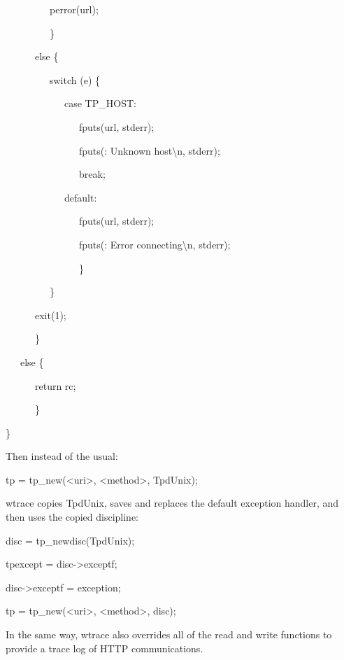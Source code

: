 {\ttfamily\mdseries
\ \ \ \ \ \ \ \ \ perror(url);}

{\ttfamily\mdseries
\ \ \ \ \ \ \ \ \ \}}

{\ttfamily\mdseries
\ \ \ \ \ \ else \{}

{\ttfamily\mdseries
\ \ \ \ \ \ \ \ \ switch (e) \{}

{\ttfamily\mdseries
\ \ \ \ \ \ \ \ \ \ \ \ case TP\_HOST:}

{\ttfamily\mdseries
\ \ \ \ \ \ \ \ \ \ \ \ \ \ \ fputs(url, stderr);}

{\ttfamily\mdseries
\ \ \ \ \ \ \ \ \ \ \ \ \ \ \ fputs({\textquotedbl}: Unknown host{\textbackslash}n{\textquotedbl}, stderr);}

{\ttfamily\mdseries
\ \ \ \ \ \ \ \ \ \ \ \ \ \ \ break;}

{\ttfamily\mdseries
\ \ \ \ \ \ \ \ \ \ \ \ default:}

{\ttfamily\mdseries
\ \ \ \ \ \ \ \ \ \ \ \ \ \ \ fputs(url, stderr);}

{\ttfamily\mdseries
\ \ \ \ \ \ \ \ \ \ \ \ \ \ \ fputs({\textquotedbl}: Error connecting{\textbackslash}n{\textquotedbl}, stderr);}

{\ttfamily\mdseries
\ \ \ \ \ \ \ \ \ \ \ \ \ \ \ \}}

{\ttfamily\mdseries
\ \ \ \ \ \ \ \ \ \}}

{\ttfamily\mdseries
\ \ \ \ \ \ exit(1); }

{\ttfamily\mdseries
\ \ \ \ \ \ \}}

{\ttfamily\mdseries
\ \ \ else \{}

{\ttfamily\mdseries
\ \ \ \ \ \ return rc;}

{\ttfamily\mdseries
\ \ \ \ \ \ \}}

{\ttfamily\mdseries
\}}


\bigskip


Then instead of the usual:

{\ttfamily\mdseries
tp = tp\_new({\textless}uri{\textgreater}, {\textless}method{\textgreater}, TpdUnix);}


wtrace copies TpdUnix, saves and replaces the default exception
handler, and then uses the copied discipline:

{\ttfamily\mdseries
disc = tp\_newdisc(TpdUnix);}

{\ttfamily\mdseries
tpexcept = disc-{\textgreater}exceptf;}

{\ttfamily\mdseries
disc-{\textgreater}exceptf = exception;}


\bigskip

{\ttfamily\mdseries
tp = tp\_new({\textless}uri{\textgreater}, {\textless}method{\textgreater}, disc);}


In the same way, wtrace also overrides all of the read and write
functions to provide a trace log of HTTP communications.
